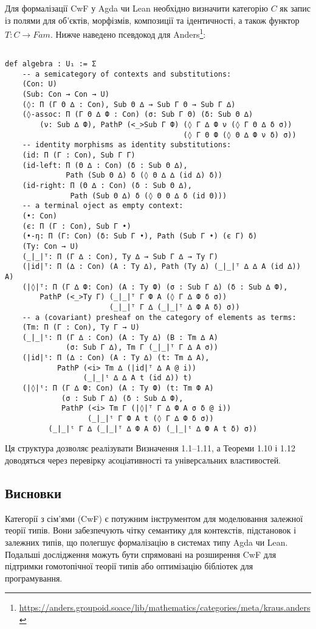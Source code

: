 \documentclass{article}
\theoremstyle{definition}
\begin{document}
Для формалізації CwF у Agda чи Lean необхідно визначити категорію $C$ як запис із полями
для об’єктів, морфізмів, композиції та ідентичності, а також функтор $T:C \rightarrow Fam$.
Нижче наведено псевдокод для Anders\footnote{\url{https://anders.groupoid.soace/lib/mathematics/categories/meta/kraus.anders}}:

\begin{lstlisting}

def algebra : U₁ := Σ
    -- a semicategory of contexts and substitutions:
    (Con: U)
    (Sub: Con → Con → U)
    (◊: Π (Г Θ ∆ : Con), Sub Θ ∆ → Sub Г Θ → Sub Г ∆)
    (◊-assoc: Π (Г Θ ∆ Ф : Con) (σ: Sub Г Θ) (δ: Sub Θ ∆)
        (ν: Sub ∆ Ф), PathP (<_>Sub Г Ф) (◊ Г ∆ Ф ν (◊ Г Θ ∆ δ σ))
                                         (◊ Г Θ Ф (◊ Θ ∆ Ф ν δ) σ))
    -- identity morphisms as identity substitutions:
    (id: Π (Г : Con), Sub Г Г)
    (id-left: Π (Θ ∆ : Con) (δ : Sub Θ ∆),
              Path (Sub Θ ∆) δ (◊ Θ ∆ ∆ (id ∆) δ))
    (id-right: Π (Θ ∆ : Con) (δ : Sub Θ ∆),
               Path (Sub Θ ∆) δ (◊ Θ Θ ∆ δ (id Θ)))
    -- a terminal oject as empty context:
    (•: Con)
    (є: Π (Г : Con), Sub Г •)
    (•-η: Π (Г: Con) (δ: Sub Г •), Path (Sub Г •) (є Г) δ)
    (Ty: Con → U)
    (_|_|ᵀ: Π (Г ∆ : Con), Ty ∆ → Sub Г ∆ → Ty Г)
    (|id|ᵀ: Π (∆ : Con) (A : Ty ∆), Path (Ty ∆) (_|_|ᵀ ∆ ∆ A (id ∆)) A)
    (|◊|ᵀ: Π (Г ∆ Ф: Con) (A : Ty Ф) (σ : Sub Г ∆) (δ : Sub ∆ Ф),
        PathP (<_>Ty Г) (_|_|ᵀ Г Ф A (◊ Г ∆ Ф δ σ))
                        (_|_|ᵀ Г ∆ (_|_|ᵀ ∆ Ф A δ) σ))
    -- a (covariant) presheaf on the category of elements as terms:
    (Tm: Π (Г : Con), Ty Г → U)
    (_|_|ᵗ: Π (Г ∆ : Con) (A : Ty ∆) (B : Tm ∆ A)
              (σ: Sub Г ∆), Tm Г (_|_|ᵀ Г ∆ A σ))
    (|id|ᵗ: Π (∆ : Con) (A : Ty ∆) (t: Tm ∆ A),
            PathP (<i> Tm ∆ (|id|ᵀ ∆ A @ i))
                  (_|_|ᵗ ∆ ∆ A t (id ∆)) t)
    (|◊|ᵗ: Π (Г ∆ Ф: Con) (A : Ty Ф) (t: Tm Ф A)
             (σ : Sub Г ∆) (δ : Sub ∆ Ф),
             PathP (<i> Tm Г (|◊|ᵀ Г ∆ Ф A σ δ @ i))
                   (_|_|ᵗ Г Ф A t (◊ Г ∆ Ф δ σ))
          (_|_|ᵗ Г ∆ (_|_|ᵀ ∆ Ф A δ) (_|_|ᵗ ∆ Ф A t δ) σ))
\end{lstlisting}

Ця структура дозволяє реалізувати Визначення 1.1–1.11, а Теореми 1.10 і 1.12 доводяться через перевірку асоціативності та універсальних властивостей.

\subsection{Висновки}

Категорії з сім’ями (CwF) є потужним інструментом для моделювання залежної теорії типів. Вони забезпечують чітку семантику для контекстів, підстановок і залежних типів, що полегшує формалізацію в системах типу Agda чи Lean. Подальші дослідження можуть бути спрямовані на розширення CwF для підтримки гомотопічної теорії типів або оптимізацію бібліотек для програмування.



\end{document}
